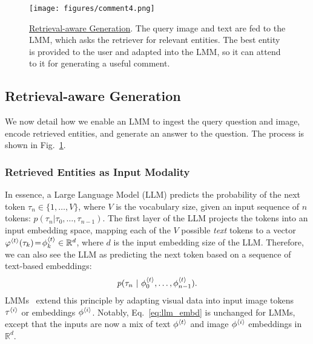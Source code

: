\begin{figure}[t]
  \centering
   \texttt{[image: figures/comment4.png]}
   \vspace*{-8mm}
   \caption{\underline{Retrieval-aware Generation}. The query image and text are fed to the LMM, which asks the retriever for relevant entities.
   The best entity is provided to the user and adapted into the LMM, so it can attend to it for generating a useful comment.}
   \label{fig:retrieve_generate}
   \vspace{-3mm}
\end{figure}

\subsection{Retrieval-aware Generation}
\label{ssec:retrieve_generate}

We now detail how we enable an LMM to ingest the query question and image, encode retrieved entities, and generate an answer to the question.
The process is shown in Fig.~\ref{fig:retrieve_generate}.
\vspace*{-3mm}
\subsubsection{Retrieved Entities as Input Modality}

In essence, a Large Language Model (LLM) predicts the probability of the next token $\tau_n\!\in\!\{1, \ldots, V\}$, where $V$ is the vocabulary size, given an input sequence of $n$ tokens: $p(\tau_{n} | \tau_0, \ldots, \tau_{n-1})$.
The first layer of the LLM projects the tokens into an input embedding space, mapping each of the $V$ possible \emph{text} tokens to a vector $\varphi^{{\langle t\rangle}}(\tau_k)\!=\!\phi^{{\langle t\rangle}}_k \in \mathbb{R}^{d}$, where $d$ is the input embedding size of the LLM.
Therefore, we can also see the LLM as predicting the next token based on a sequence of text-based embeddings:
\begin{equation}
    p(\tau_{n} ~ | ~ \phi^{{\langle t\rangle}}_0, \ldots, \phi^{{\langle t\rangle}}_{n-1}).
    \label{eq:llm_embd}
\end{equation}
LMMs~\cite{liu2023improvedllava, chen2024internvl} extend this principle by adapting visual data into input image tokens $\tau^{{\langle i\rangle}}$ or embeddings $\phi^{{\langle i\rangle}}$.
%
Notably, Eq.~\ref{eq:llm_embd} is unchanged for LMMs, except that the inputs are now a mix of text $\phi^{{\langle t\rangle}}$ and image $\phi^{{\langle i\rangle}}$ embeddings in $\mathbb{R}^d$.

